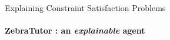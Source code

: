 \documentclass{beamer}
\newcommand{\phantomgraphics}[2][]{%
  \leavevmode\phantom{\texttt{[image: \#2]}}%
}
\begin{document}
\begin{frame}{\small{Explaining Constraint Satisfaction Problems}}
    \framesubtitle{ZebraTutor : an \emph{explainable} agent }


\end{frame}
\end{document}
